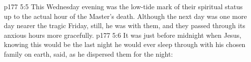 \vs p177 5:5 This Wednesday evening was the low\hyp{}tide mark of their spiritual status up to the actual hour of the Master’s death. Although the next day was one more day nearer the tragic Friday, still, he was with them, and they passed through its anxious hours more gracefully.
\vs p177 5:6 It was just before midnight when Jesus, knowing this would be the last night he would ever sleep through with his chosen family on earth, said, as he dispersed them for the night: 
